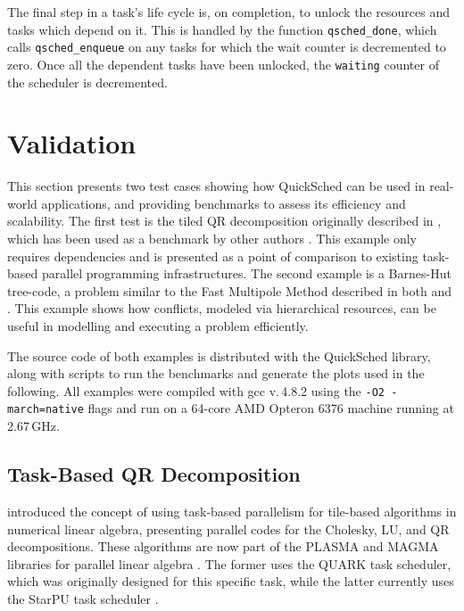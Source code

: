 \documentclass[preprint]{elsarticle}
\begin{document}
The final step in a task's life cycle is, on completion,
to unlock the resources and tasks which depend on it.
This is handled by the function {\tt qsched\_done}, which
calls {\tt qsched\_enqueue} on any tasks for which the
wait counter is decremented to zero.
Once all the dependent tasks have been unlocked, the
{\tt waiting} counter of the scheduler is decremented.


\section{Validation}

This section presents two test cases showing
how QuickSched can be used in real-world applications, and
providing benchmarks to assess its efficiency and scalability.
The first test is the tiled QR decomposition originally
described in \cite{ref:Buttari2009}, which has been used as a benchmark
by other authors \cite{ref:Agullo2009b,ref:Badia2009,ref:Bosilca2012}.
This example only requires dependencies and is presented 
as a point of comparison to existing task-based parallel
programming infrastructures.
The second example is a Barnes-Hut tree-code, a problem
similar to the Fast Multipole Method described in both
\cite{ref:Ltaief2012} and \cite{ref:Agullo2013}.
This example shows how conflicts, modeled
via hierarchical resources, can be useful in modelling and executing
a problem efficiently.

The source code of both examples is distributed with the
QuickSched library, along with scripts to run the benchmarks
and generate the plots used in the following.
All examples were compiled with gcc v.\,4.8.2 using the
{\tt -O2 -march=native} flags and run on
a 64-core AMD Opteron 6376 machine running
at 2.67\,GHz.


\subsection{Task-Based QR Decomposition}

\cite{ref:Buttari2009} introduced the concept of using task-based
parallelism for tile-based algorithms in numerical linear algebra,
presenting parallel codes for the Cholesky, LU, and QR
decompositions.
These algorithms are now part of the PLASMA and MAGMA
libraries for parallel linear algebra \cite{ref:Agullo2009}.
The former uses the QUARK task scheduler, which was originally
designed for this specific task, while the latter currently uses
the StarPU task scheduler \cite{ref:Agullo2011}.
\end{document}
